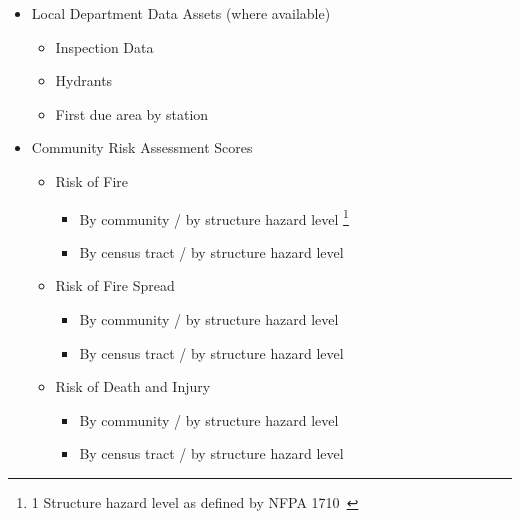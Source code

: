 \documentclass[12pt,oneside]{book}
\begin{document}
\begin{itemize}[noitemsep]
\begin{itemize}[noitemsep]
  \end{itemize}
\item Local Department Data Assets (where available)
  \begin{itemize}[noitemsep]
  \item Inspection Data
  \item Hydrants
  \item First due area by station
  \end{itemize}
\clearpage
\item Community Risk Assessment Scores
  \begin{itemize}[noitemsep]
  \item Risk of Fire
  \begin{itemize}[noitemsep]
    \item By community / by structure hazard level \footnote{1 Structure hazard level as defined by NFPA 1710~\cite{nfpa_1710}}
    \item By census tract / by structure hazard level
  \end{itemize}
  \item Risk of Fire Spread
    \begin{itemize}[noitemsep]
    \item By community / by structure hazard level
    \item By census tract / by structure hazard level
    \end{itemize}
  \item Risk of Death and Injury
    \begin{itemize}[noitemsep]
    \item By community / by structure hazard level
    \item By census tract / by structure hazard level
    \end{itemize}
  \end{itemize}
\end{itemize}


\end{document}
